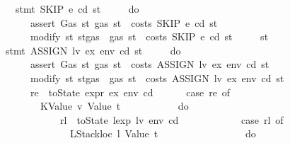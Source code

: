 \begin{isabellebody}
\ \ \ {\isachardoublequoteopen}stmt\ SKIP\ e\ cd\ st\ {\isacharequal}{\kern0pt}\isanewline
\ \ \ \ {\isacharparenleft}{\kern0pt}do\ {\isacharbraceleft}{\kern0pt}\isanewline
\ \ \ \ \ \ assert\ Gas\ {\isacharparenleft}{\kern0pt}{\isasymlambda}st{\isachardot}{\kern0pt}\ gas\ st\ {\isachargreater}{\kern0pt}\ costs\ SKIP\ e\ cd\ st{\isacharparenright}{\kern0pt}{\isacharsemicolon}{\kern0pt}\isanewline
\ \ \ \ \ \ modify\ {\isacharparenleft}{\kern0pt}{\isasymlambda}st{\isachardot}{\kern0pt}\ st{\isasymlparr}gas\ {\isacharcolon}{\kern0pt}{\isacharequal}{\kern0pt}\ gas\ st\ {\isacharminus}{\kern0pt}\ costs\ SKIP\ e\ cd\ st{\isasymrparr}{\isacharparenright}{\kern0pt}\isanewline
\ \ \ \ {\isacharbraceright}{\kern0pt}{\isacharparenright}{\kern0pt}\ st{\isachardoublequoteclose}\isanewline
{\isacharbar}{\kern0pt}\ {\isachardoublequoteopen}stmt\ {\isacharparenleft}{\kern0pt}ASSIGN\ lv\ ex{\isacharparenright}{\kern0pt}\ env\ cd\ st\ {\isacharequal}{\kern0pt}\isanewline
\ \ \ \ {\isacharparenleft}{\kern0pt}do\ {\isacharbraceleft}{\kern0pt}\isanewline
\ \ \ \ \ \ assert\ Gas\ {\isacharparenleft}{\kern0pt}{\isasymlambda}st{\isachardot}{\kern0pt}\ gas\ st\ {\isachargreater}{\kern0pt}\ costs\ {\isacharparenleft}{\kern0pt}ASSIGN\ lv\ ex{\isacharparenright}{\kern0pt}\ env\ cd\ st{\isacharparenright}{\kern0pt}{\isacharsemicolon}{\kern0pt}\isanewline
\ \ \ \ \ \ modify\ {\isacharparenleft}{\kern0pt}{\isasymlambda}st{\isachardot}{\kern0pt}\ st{\isasymlparr}gas\ {\isacharcolon}{\kern0pt}{\isacharequal}{\kern0pt}\ gas\ st\ {\isacharminus}{\kern0pt}\ costs\ {\isacharparenleft}{\kern0pt}ASSIGN\ lv\ ex{\isacharparenright}{\kern0pt}\ env\ cd\ st{\isasymrparr}{\isacharparenright}{\kern0pt}{\isacharsemicolon}{\kern0pt}\isanewline
\ \ \ \ \ \ re\ {\isasymleftarrow}\ toState\ {\isacharparenleft}{\kern0pt}expr\ ex\ env\ cd{\isacharparenright}{\kern0pt}{\isacharsemicolon}{\kern0pt}\isanewline
\ \ \ \ \ \ case\ re\ of\isanewline
\ \ \ \ \ \ \ \ {\isacharparenleft}{\kern0pt}KValue\ v{\isacharcomma}{\kern0pt}\ Value\ t{\isacharparenright}{\kern0pt}\ {\isasymRightarrow}\isanewline
\ \ \ \ \ \ \ \ \ \ do\ {\isacharbraceleft}{\kern0pt}\isanewline
\ \ \ \ \ \ \ \ \ \ \ \ rl\ {\isasymleftarrow}\ toState\ {\isacharparenleft}{\kern0pt}lexp\ lv\ env\ cd{\isacharparenright}{\kern0pt}{\isacharsemicolon}{\kern0pt}\isanewline
\ \ \ \ \ \ \ \ \ \ \ \ case\ rl\ of\isanewline
\ \ \ \ \ \ \ \ \ \ \ \ \ \ {\isacharparenleft}{\kern0pt}LStackloc\ l{\isacharcomma}{\kern0pt}\ Value\ t{\isacharprime}{\kern0pt}{\isacharparenright}{\kern0pt}\ {\isasymRightarrow}\isanewline
\ \ \ \ \ \ \ \ \ \ \ \ \ \ \ \ do\ {\isacharbraceleft}{\kern0pt}\isanewline

\end{isabellebody}
